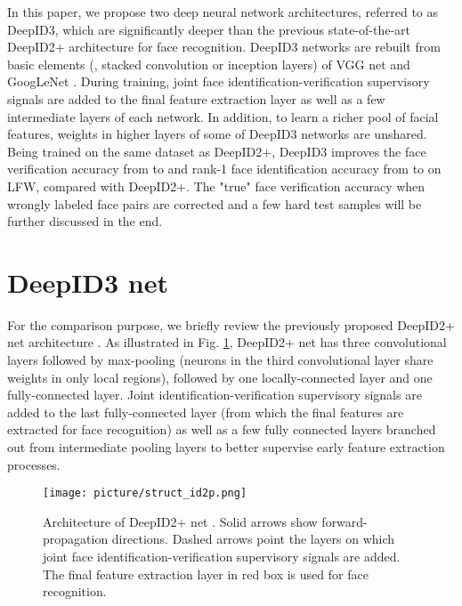 \documentclass[10pt,twocolumn,letterpaper]{article}
\begin{document}
In this paper, we propose two deep neural network architectures, referred to as DeepID3, which are significantly deeper than the previous state-of-the-art DeepID2+ architecture for face recognition. DeepID3 networks are rebuilt from basic elements (\ie, stacked convolution or inception layers) of VGG net \cite{simonyan2014} and GoogLeNet \cite{szegedy2014}. During training, joint face identification-verification supervisory signals \cite{sun2014b} are added to the final feature extraction layer as well as a few intermediate layers of each network. In addition, to learn a richer pool of facial features, weights in higher layers of some of DeepID3 networks are unshared. Being trained on the same dataset as DeepID2+, DeepID3 improves the face verification accuracy from  to  and rank-1 face identification accuracy from  to  on LFW, compared with DeepID2+. The "true" face verification accuracy when wrongly labeled face pairs are corrected and a few hard test samples will be further discussed in the end.


\section{DeepID3 net}

For the comparison purpose, we briefly review the previously proposed DeepID2+ net architecture \cite{sun2014c}. As illustrated in Fig. \ref{fig:struct_id2p}, DeepID2+ net has three convolutional layers followed by max-pooling (neurons in the third convolutional layer share weights in only local regions), followed by one locally-connected layer and one fully-connected layer. Joint identification-verification supervisory signals \cite{sun2014b} are added to the last fully-connected layer (from which the final features are extracted for face recognition) as well as a few fully connected layers branched out from intermediate pooling layers to better supervise early feature extraction processes.

\begin{figure}[t]
\begin{center}
\texttt{[image: picture/struct\_id2p.png]}
\end{center}
\vspace{-0.15in}
\caption{Architecture of DeepID2+ net \cite{sun2014c}. Solid arrows show forward-propagation directions. Dashed arrows point the layers on which joint face identification-verification supervisory signals are added. The final feature extraction layer in red box is used for face recognition.}
\label{fig:struct_id2p}
\end{figure}
\end{document}

